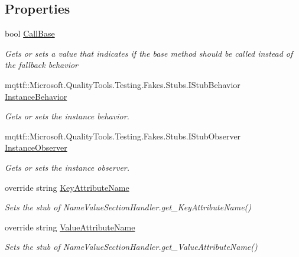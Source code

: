 \subsection*{Properties}
\begin{DoxyCompactItemize}
\item 
bool \hyperlink{class_system_1_1_configuration_1_1_fakes_1_1_stub_name_value_section_handler_a21e2f81b2857d932bdda86f9394a640c}{Call\-Base}
\begin{DoxyCompactList}\small\item\em Gets or sets a value that indicates if the base method should be called instead of the fallback behavior\end{DoxyCompactList}\item 
mqttf\-::\-Microsoft.\-Quality\-Tools.\-Testing.\-Fakes.\-Stubs.\-I\-Stub\-Behavior \hyperlink{class_system_1_1_configuration_1_1_fakes_1_1_stub_name_value_section_handler_a1124cf4271096dc109ca6ca1e6d2cf37}{Instance\-Behavior}
\begin{DoxyCompactList}\small\item\em Gets or sets the instance behavior.\end{DoxyCompactList}\item 
mqttf\-::\-Microsoft.\-Quality\-Tools.\-Testing.\-Fakes.\-Stubs.\-I\-Stub\-Observer \hyperlink{class_system_1_1_configuration_1_1_fakes_1_1_stub_name_value_section_handler_a6be65ca27800c5e6c4fdf2657d4bad19}{Instance\-Observer}
\begin{DoxyCompactList}\small\item\em Gets or sets the instance observer.\end{DoxyCompactList}\item 
override string \hyperlink{class_system_1_1_configuration_1_1_fakes_1_1_stub_name_value_section_handler_aadf0b583c4596bd302b8d5c87a6d5ac9}{Key\-Attribute\-Name}
\begin{DoxyCompactList}\small\item\em Sets the stub of Name\-Value\-Section\-Handler.\-get\-\_\-\-Key\-Attribute\-Name()\end{DoxyCompactList}\item 
override string \hyperlink{class_system_1_1_configuration_1_1_fakes_1_1_stub_name_value_section_handler_ac3a7d31f9c70da374850333257f29b06}{Value\-Attribute\-Name}
\begin{DoxyCompactList}\small\item\em Sets the stub of Name\-Value\-Section\-Handler.\-get\-\_\-\-Value\-Attribute\-Name()\end{DoxyCompactList}\end{DoxyCompactItemize}


